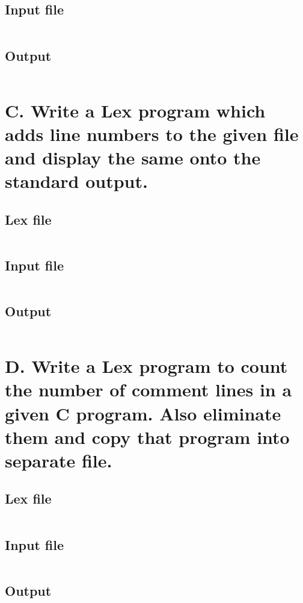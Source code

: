 \documentclass[paper=letter, fontsize=12pt]{article}
\begin{document}
\subsection{Input file}
\inputminted{text}{../b/index.html}

\subsection{Output}
\inputminted{text}{../b/output.txt}

\section{{\LARGE C. Write a Lex program   which   adds   line   numbers   to   the   given   file   and display the same onto the standard output.}}
\subsection{Lex file}
\inputminted{c}{../c/c.l}

\subsection{Input file}
\inputminted{text}{../c/in.c}

\subsection{Output}
\inputminted{text}{../c/out}

\section{{\LARGE D. Write  a  Lex  program  to  count  the  number  of  comment  lines in  a  given  C program. Also eliminate them and copy that program into separate file.}}
\subsection{Lex file}
\inputminted{c}{../d/d.l}

\subsection{Input file}
\inputminted{text}{../d/in.c}

\subsection{Output}
\inputminted{text}{../d/out}
\end{document}
